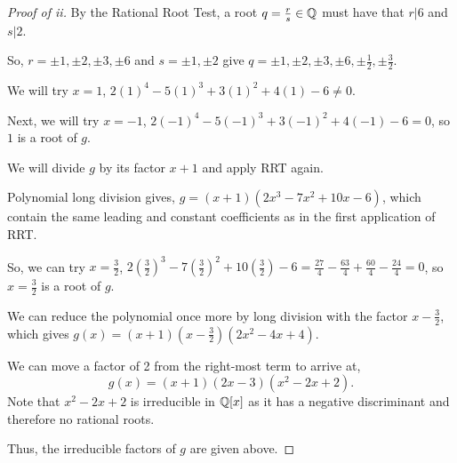 \documentclass[../hw5]{subfiles}
\begin{document}
\begin{proof}[Proof of ii]
	By the Rational Root Test, a root $q=\frac{r}{s}\in \mathbb{Q}$ must have that $r|6$ and  $s|2$.

	So, $r= \pm 1, \pm 2, \pm 3, \pm 6$ and $s= \pm 1, \pm 2$ give
	$q= \pm 1, \pm 2, \pm 3, \pm 6, \pm \frac{1}{2}, \pm \frac{3}{2}$.

	We will try $x=1$,  $2(1)^4-5(1)^3+3(1)^2+4(1)-6\neq 0$.

	Next, we will try $x=-1$,  $2(-1)^4-5(-1)^3+3(-1)^2+4(-1)-6 =0$, so $1$ is a root of  $g$.

	We will divide $g$ by its factor  $x+1$ and apply RRT again.

	Polynomial long division gives,  $g=(x+1)(2x^3-7x^2+10x-6)$, which contain the same leading and constant coefficients as in the first application of RRT.

	So, we can try $x=\frac{3}{2}$, $2\left( \frac{3}{2} \right)^3-7\left( \frac{3}{2} \right)^2+10\left( \frac{3}{2} \right)-6=\frac{27}{4}-\frac{63}{4}+\frac{60}{4}-\frac{24}{4}=0$, so $x=\frac{3}{2}$ is a root of $g$.

	We can reduce the polynomial once more by long division with the factor $x-\frac{3}{2}$, which gives $g(x)=(x+1)\left(x-\frac{3}{2}\right)(2x^2-4x+4)$.

	We can move a factor of 2 from the right-most term to arrive at, \[
		g(x)=(x+1)(2x-3)(x^2-2x+2)
		.\]
	Note that $x^2-2x+2$ is irreducible in $\mathbb{Q}[x]$ as it has a negative discriminant and therefore no rational roots.

	Thus, the irreducible factors of $g$ are given above.
\end{proof}
\end{document}
